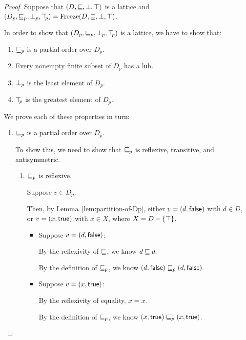 \begin{proof}
  Suppose that $(D, \sqsubseteq, \bot, \top)$ is a lattice and $(D_p,
  \sqsubseteq_p, \bot_{p}, \top\hspace{-0.85mm}_{p}) = \mathrm{Freeze}(D, \sqsubseteq, \bot, \top)$.

  In order to show that $(D_p, \sqsubseteq_p, \bot_{p}, \top\hspace{-0.85mm}_{p})$ is a lattice, we
  have to show that:
  \begin{enumerate}
  \item $\sqsubseteq_p$ is a partial order over $D_p$.

  \item Every nonempty finite subset of $D_p$ has a lub.

  \item $\bot_{p}$ is the least element of $D_p$.

  \item $\top\hspace{-0.85mm}_{p}$ is the greatest element of $D_p$.
  \end{enumerate}

  We prove each of these properties in turn:

  \begin{enumerate}
  \item $\sqsubseteq_p$ is a partial order over $D_p$.

    To show this, we need to show that $\sqsubseteq_p$ is reflexive, transitive,
    and antisymmetric. 
    \begin{enumerate}
    \item $\sqsubseteq_p$ is reflexive.

      Suppose $v \in D_p$.

      Then, by Lemma~\ref{lem:partition-of-Dp}, either $v =
      (d, \textsf{false})$ with $d \in D$, or $v =
      (x, \textsf{true})$ with $x \in X$, where $X = D -
      \left\{\top\right\}$.
      \begin{itemize}
      \item Suppose $v = (d, \textsf{false})$:

        By the reflexivity of $\sqsubseteq$, we know $d \sqsubseteq d$.

        By the definition of $\sqsubseteq_p$, we know $(d, \textsf{false})
        \sqsubseteq_p (d, \textsf{false})$.

      \item Suppose $v = (x, \textsf{true})$: 
        
        By the reflexivity of equality, $x = x$.

        By the definition of $\sqsubseteq_p$, we know $(x, \textsf{true})
        \sqsubseteq_p (x, \textsf{true})$.
      \end{itemize}


\end{enumerate}
\end{enumerate}
\end{proof}
